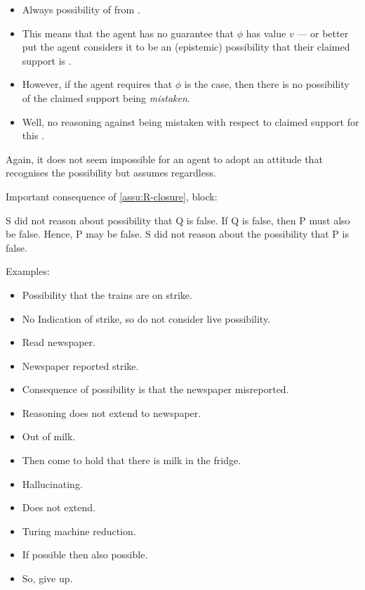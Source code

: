 \begin{note}
  \color{red}
    \begin{itemize}
    \item Always possibility of \mom{} from \nfcs{}.
    \item This means that the agent has no guarantee that \(\phi\) has value \(v\) --- or better put the agent considers it to be an (epistemic) possibility that their claimed support is \mom{}.
    \item However, if the agent requires that \(\phi\) is the case, then there is no possibility of the claimed support being \emph{mistaken}.
    \item Well, no reasoning against being mistaken with respect to claimed support for this \requ{}.
  \end{itemize}

  Again, it does not seem impossible for an agent to adopt an attitude that recognises the possibility but assumes regardless.
\end{note}

\begin{note}
  Important consequence of \autoref{assu:R-closure}, block:

  S did not reason about possibility that Q is false.
  If Q is false, then P must also be false.
  Hence, P may be false.
  S did not reason about the possibility that P is false.

  \begin{note}
  Examples:
  \begin{itemize}
  \item Possibility that the trains are on strike.
  \item No Indication of strike, so do not consider live possibility.
  \item Read newspaper.
  \item Newspaper reported strike.
  \item Consequence of possibility is that the newspaper misreported.
  \item Reasoning does not extend to newspaper.
  \end{itemize}

  \begin{itemize}
  \item Out of milk.
  \item Then come to hold that there is milk in the fridge.
  \item Hallucinating.
  \item Does not extend.
  \end{itemize}

  \begin{itemize}
  \item Turing machine reduction.
  \item If possible then also possible.
  \item So, give up.
  \end{itemize}
\end{note}
\end{note}



